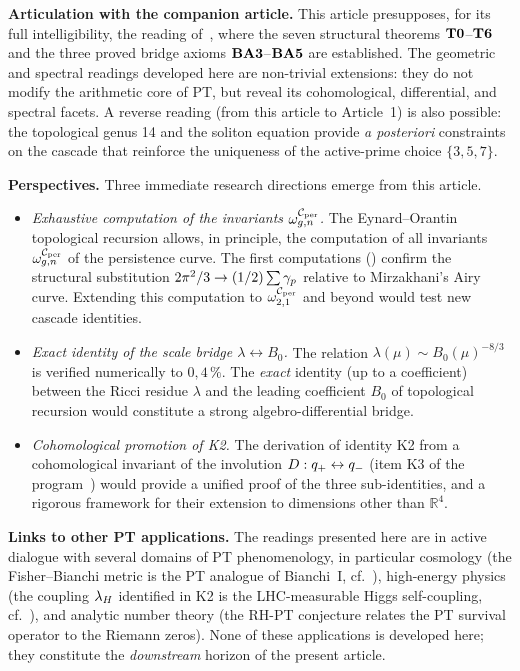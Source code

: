 \textbf{Articulation with the companion article.} This article presupposes, for its full intelligibility, the reading of~\cite{PT_Article1_Foundations}, where the seven structural theorems $\textbf{T0}$--$\textbf{T6}$ and the three proved bridge axioms $\textbf{BA3}$--$\textbf{BA5}$ are established. The geometric and spectral readings developed here are non-trivial extensions: they do not modify the arithmetic core of PT, but reveal its cohomological, differential, and spectral facets. A reverse reading (from this article to Article~1) is also possible: the topological genus 14 and the soliton equation provide \emph{a posteriori} constraints on the cascade that reinforce the uniqueness of the active-prime choice $\{3, 5, 7\}$.

\textbf{Perspectives.} Three immediate research directions emerge from this article.
\begin{itemize}[nosep,leftmargin=*]
\item \emph{Exhaustive computation of the invariants $\omega_{g,n}^{\mathcal{C}_{\rm per}}$.} The Eynard--Orantin topological recursion allows, in principle, the computation of all invariants $\omega_{g,n}^{\mathcal{C}_{\rm per}}$ of the persistence curve. The first computations (\cite[\S 8]{PT_GeoFlow_PersistenceCurve}) confirm the structural substitution $2\pi^{2}/3 \to (1/2) \sum \gamma_{p}$ relative to Mirzakhani's Airy curve. Extending this computation to $\omega_{2,1}^{\mathcal{C}_{\rm per}}$ and beyond would test new cascade identities.
\item \emph{Exact identity of the scale bridge $\lambda \leftrightarrow B_0$.} The relation $\lambda(\mu) \sim B_0(\mu)^{-8/3}$ is verified numerically to $0{,}4\,\%$. The \emph{exact} identity (up to a coefficient) between the Ricci residue $\lambda$ and the leading coefficient $B_0$ of topological recursion would constitute a strong algebro-differential bridge.
\item \emph{Cohomological promotion of K2.} The derivation of identity K2 from a cohomological invariant of the involution $D : q_{+} \leftrightarrow q_{-}$ (item K3 of the program~\cite{PT_NewMath_Consolidation}) would provide a unified proof of the three sub-identities, and a rigorous framework for their extension to dimensions other than $\mathbb R^{4}$.
\end{itemize}

\textbf{Links to other PT applications.} The readings presented here are in active dialogue with several domains of PT phenomenology, in particular cosmology (the Fisher--Bianchi metric is the PT analogue of Bianchi~I, cf.~\cite{companion_M3,companion_M5}), high-energy physics (the coupling $\lambda_H$ identified in K2 is the LHC-measurable Higgs self-coupling, cf.~\cite{companion_M5}), and analytic number theory (the RH-PT conjecture relates the PT survival operator to the Riemann zeros). None of these applications is developed here; they constitute the \emph{downstream} horizon of the present article.

